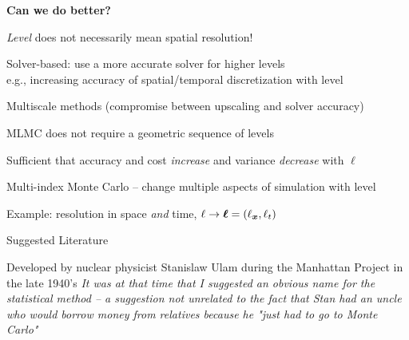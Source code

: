 \begin{frame}{\name{}}

    \textbf{Can we do better?}\vskip2mm
    \begin{squarelist}
        \item<2-> \emph{Level} does not necessarily mean spatial resolution!
        \begin{circlelist}
            \item Solver-based: use a more accurate solver for higher levels\\
            e.g., increasing accuracy of spatial/temporal discretization with level
            \item Multiscale methods (compromise between upscaling and solver accuracy)
        \end{circlelist}
        \item<3-> MLMC does not require a geometric sequence of levels 
        \begin{circlelist}
            \item Sufficient that accuracy and cost \emph{increase} and variance \emph{decrease} with $\ell$
        \end{circlelist}
        \item<4-> Multi-index Monte Carlo -- change multiple aspects of simulation with
        level
        \begin{circlelist}
            \item Example: resolution in space \emph{and} time, $\ell \rightarrow \bm{\ell} = (\ell_{\bm{x}}, \ell_t)$
        \end{circlelist}
    \end{squarelist}
    
\end{frame}

\def\name{Suggested Literature}

\begin{frame}{\name{}}
	\begin{scriptsize}
    	
	\end{scriptsize}
\end{frame}

\begin{frame}
    \vspace{1em}
    \begin{block}{}
        \small
        Developed by nuclear physicist Stanislaw Ulam during the Manhattan Project in the late 1940's\vskip5mm
        {\itshape It was at that time that I suggested an obvious name for the statistical method -- a suggestion not unrelated to the fact that Stan had an uncle who would borrow money from relatives because he "just had to go to Monte Carlo"}\vskip5mm
        \hspace*{}
    \end{block}
\end{frame}